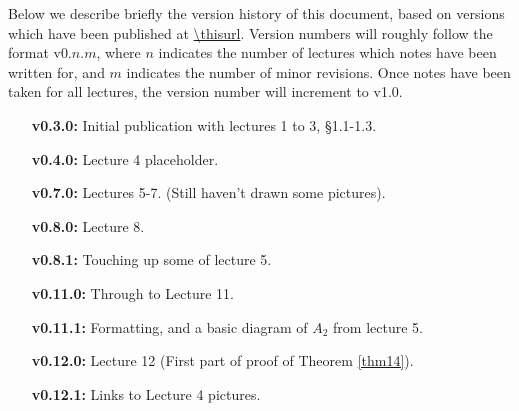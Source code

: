 Below we describe briefly the version history of this document, based on
versions which have been published at \url{\thisurl}. Version numbers will
roughly follow the format v0.$n$.$m$, where $n$ indicates the number of
lectures which notes have been written for, and $m$ indicates the number of
minor revisions. Once notes have been taken for all lectures, the version
number will increment to v1.0.

\begin{enumerate}
\item[\bf v0.3.0:] Initial publication with lectures 1 to 3, \S1.1-1.3.
\item[\bf v0.4.0:] Lecture 4 placeholder.
\item[\bf v0.7.0:] Lectures 5-7. (Still haven't drawn some pictures).
\item[\bf v0.8.0:] Lecture 8.
\item[\bf v0.8.1:] Touching up some of lecture 5.
\item[\bf v0.11.0:] Through to Lecture 11.
\item[\bf v0.11.1:] Formatting, and a basic diagram of $A_2$ from lecture 5.
\item[\bf v0.12.0:] Lecture 12 (First part of proof of Theorem \ref{thm14}).
\item[\bf v0.12.1:] Links to Lecture 4 pictures.
\end{enumerate}
